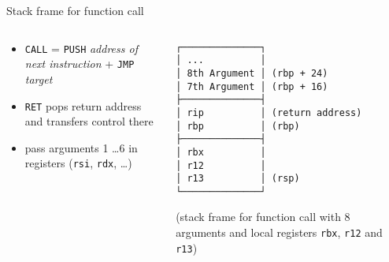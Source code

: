 \begin{frame}[fragile]{Stack frame for function call}
    \begin{columns}
        \begin{column}{.4\textwidth}
            \begin{itemize}
                \item \texttt{CALL} = \texttt{PUSH} \textit{address of next instruction} + \texttt{JMP} \textit{target}
                \item \texttt{RET} pops return address and transfers control there
                \item pass arguments 1 \ldots 6 in registers (\texttt{rsi}, \texttt{rdx}, \ldots)
            \end{itemize}
        \end{column}
        \begin{column}{.6\textwidth}
            \begin{Verbatim}
┌──────────────┐
│ ...          │
│ 8th Argument │ (rbp + 24)
│ 7th Argument │ (rbp + 16)
├──────────────┤
│ rip          │ (return address)
│ rbp          │ (rbp)
├──────────────┤
│ rbx          │
│ r12          │
│ r13          │ (rsp)
└──────────────┘
            \end{Verbatim}
            (stack frame for function call with 8 arguments and local registers \texttt{rbx}, \texttt{r12} and \texttt{r13})
        \end{column}
    \end{columns}
\end{frame}


